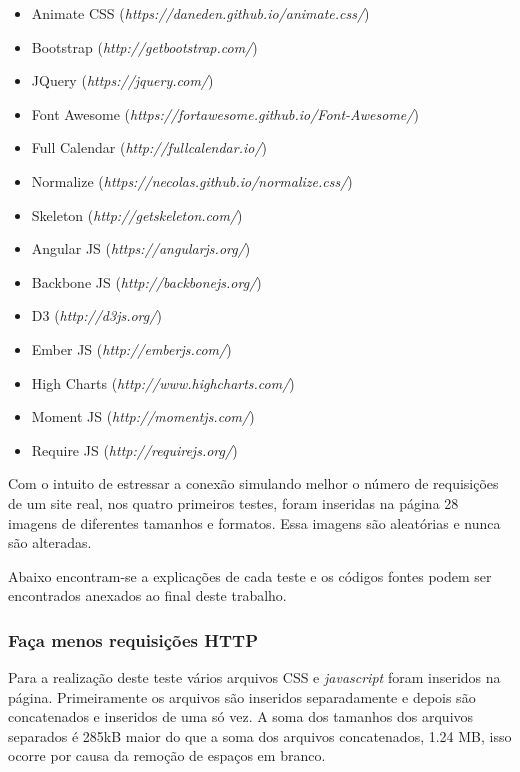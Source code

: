 \begin{itemize}
	\item Animate CSS (\textit{https://daneden.github.io/animate.css/})
	\item Bootstrap (\textit{http://getbootstrap.com/})
	\item JQuery (\textit{https://jquery.com/})
	\item Font Awesome (\textit{https://fortawesome.github.io/Font-Awesome/})
	\item Full Calendar (\textit{http://fullcalendar.io/})
	\item Normalize (\textit{https://necolas.github.io/normalize.css/})
	\item Skeleton (\textit{http://getskeleton.com/})
	\item Angular JS (\textit{https://angularjs.org/})
	\item Backbone JS (\textit{http://backbonejs.org/})
	\item D3 (\textit{http://d3js.org/})
	\item Ember JS (\textit{http://emberjs.com/})
	\item High Charts (\textit{http://www.highcharts.com/})
	\item Moment JS (\textit{http://momentjs.com/})
	\item Require JS (\textit{http://requirejs.org/})
\end{itemize}

Com o intuito de estressar a conexão simulando melhor o número de requisições de um site real, nos quatro primeiros testes, foram inseridas na página 28 imagens de diferentes tamanhos e formatos. Essa imagens são aleatórias e nunca são alteradas.

Abaixo encontram-se a explicações de cada teste e os códigos fontes podem ser encontrados anexados ao final deste trabalho.

\subsubsection{Faça menos requisições HTTP}
\label{facamenosrequisicoeshttp}

Para a realização deste teste vários arquivos CSS e \textit{javascript} foram inseridos na página. Primeiramente os arquivos são inseridos separadamente e depois são concatenados e inseridos de uma só vez. A soma dos tamanhos dos arquivos separados é 285kB maior do que a soma dos arquivos concatenados, 1.24 MB, isso ocorre por causa da remoção de espaços em branco.

